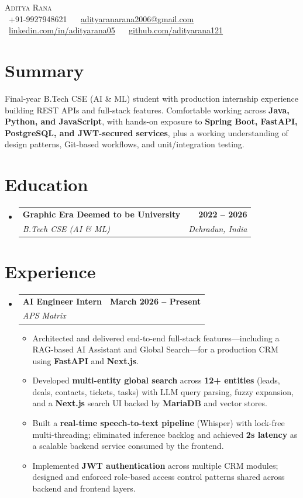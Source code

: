 \documentclass[letterpaper,11pt]{article}
\makeatletter
\newcommand{\resumeItem}[1]{
  \item \small{#1}
}
\newcommand{\resumeItemListStart}{
\begin{itemize}[leftmargin=*, itemsep=0pt, topsep=0pt, parsep=0pt, partopsep=0pt]
}
\newcommand{\resumeItemListEnd}{\end{itemize}\vspace{-5pt}}
\newcommand{\resumeSubheading}[4]{
\item
\begin{tabular*}{1.0\textwidth}{l@{\extracolsep{\fill}}r}
\textbf{#1} & \textbf{\small #2} \\
\textit{\small#3} & \textit{\small #4} \\
\end{tabular*}\vspace{-6pt}}
\newcommand{\resumeSubHeadingListStart}{\begin{itemize}[leftmargin=0in,label={}]}
\newcommand{\resumeSubHeadingListEnd}{\end{itemize}}
\makeatother
\begin{document}
\begin{center}
{\Huge \scshape Aditya Rana} \\ \vspace{2pt}
\small \faPhone\ +91-9927948621 ~
\faEnvelope\ \href{mailto:adityaranarana2006@gmail.com}{adityaranarana2006@gmail.com} ~
\faLinkedin\ \href{https://linkedin.com/in/adityarana05}{linkedin.com/in/adityarana05} ~
\faGithub\ \href{https://github.com/adityarana121}{github.com/adityarana121}
\end{center}

\section{Summary}
Final-year B.Tech CSE (AI \& ML) student with production internship experience building REST APIs and full-stack features. Comfortable working across \textbf{Java, Python, and JavaScript}, with hands-on exposure to \textbf{Spring Boot, FastAPI, PostgreSQL, and JWT-secured services}, plus a working understanding of design patterns, Git-based workflows, and unit/integration testing.

\section{Education}
\resumeSubHeadingListStart
\resumeSubheading
{Graphic Era Deemed to be University}{2022 -- 2026}
{B.Tech CSE (AI \& ML)}{Dehradun, India}
\resumeSubHeadingListEnd

\section{Experience}
\resumeSubHeadingListStart
\resumeSubheading
{AI Engineer Intern}{March 2026 -- Present}
{APS Matrix}{}
\resumeItemListStart
\resumeItem{Architected and delivered end-to-end full-stack features—including a RAG-based AI Assistant and Global Search—for a production CRM using \textbf{FastAPI} and \textbf{Next.js}.}
\resumeItem{Developed \textbf{multi-entity global search} across \textbf{12+ entities} (leads, deals, contacts, tickets, tasks) with LLM query parsing, fuzzy expansion, and a \textbf{Next.js} search UI backed by \textbf{MariaDB} and vector stores.}
\resumeItem{Built a \textbf{real-time speech-to-text pipeline} (Whisper) with lock-free multi-threading; eliminated inference backlog and achieved \textbf{2s latency} as a scalable backend service consumed by the frontend.}
\resumeItem{Implemented \textbf{JWT authentication} across multiple CRM modules; designed and enforced role-based access control patterns shared across backend and frontend layers.}
\resumeItemListEnd
\resumeSubHeadingListEnd
\end{document}
